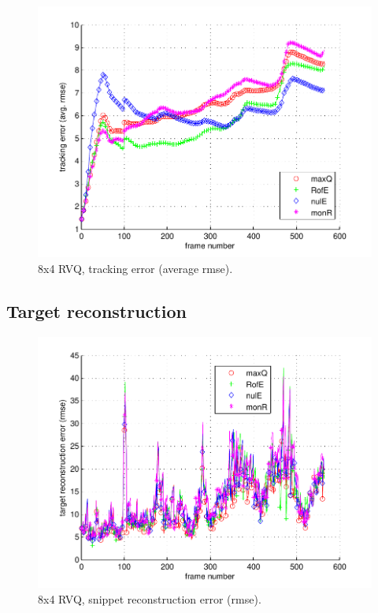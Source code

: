 								\begin{figure}[h!]
								\centering
								\includegraphics[height=0.38\textheight]{thesis/1_Dudek_8_4_1000_trk_armse.pdf}
								\caption{8x4 RVQ, tracking error (average rmse).}
								\label{fig:1_Dudek_8_4_1000_trk_avg_rmse}
								\end{figure}

\clearpage
\newpage
\subsection{Target reconstruction}

								\begin{figure}[h!]
								\centering
								\includegraphics[height=0.4\textheight]{thesis/1_Dudek_8_4_1000_snp_rmse.pdf}
								\caption{8x4 RVQ, snippet reconstruction error (rmse).}
								\label{fig:1_Dudek_8_4_1000_snp_rmse}
								\end{figure}



